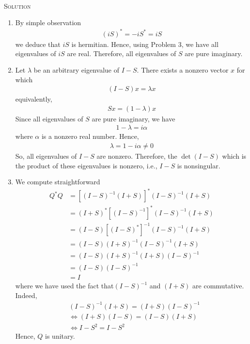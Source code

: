 \documentclass[a4paper,oneside]{book}
\numberwithin{equation}{chapter}
\begin{document}
\textsc{Solution} 
\begin{enumerate}
\item By simple observation
\begin{align}
{\left( {iS} \right)^*} =  - i{S^*} = iS
\end{align}
we deduce that $iS$ is hermitian. Hence, using Problem 3, we have all eigenvalues of $iS$ are real. Therefore, all eigenvalues of $S$ are pure imaginary.
\item Let $\lambda$ be an arbitrary eigenvalue of $I-S$. There exists a nonzero vector $x$ for which
\begin{align}
\left( {I - S} \right)x = \lambda x
\end{align}
equivalently,
\begin{align}
Sx = \left( {1 - \lambda } \right)x
\end{align}
Since all eigenvalues of $S$ are pure imaginary, we have
\begin{align}
1 - \lambda  = i\alpha 
\end{align}
where $\alpha$ is a nonzero real number. Hence,
\begin{align}
\lambda  = 1 - i\alpha  \ne 0
\end{align}
So, all eigenvalues of $I-S$ are nonzero. Therefore, the $\det \left( I-S\right)$ which is the product of these eigenvalues is nonzero, i.e., $I-S$ is nonsingular.
\item We compute straightforward
\begin{align}
{Q^*}Q &= {\left[ {{{\left( {I - S} \right)}^{ - 1}}\left( {I + S} \right)} \right]^*}{\left( {I - S} \right)^{ - 1}}\left( {I + S} \right)\\
 &= {\left( {I + S} \right)^*}{\left[ {{{\left( {I - S} \right)}^{ - 1}}} \right]^*}{\left( {I - S} \right)^{ - 1}}\left( {I + S} \right)\\
 &= \left( {I - S} \right){\left[ {{{\left( {I - S} \right)}^*}} \right]^{ - 1}}{\left( {I - S} \right)^{ - 1}}\left( {I + S} \right)\\
 &= \left( {I - S} \right){\left( {I + S} \right)^{ - 1}}{\left( {I - S} \right)^{ - 1}}\left( {I + S} \right)\\
 &= \left( {I - S} \right){\left( {I + S} \right)^{ - 1}}\left( {I + S} \right){\left( {I - S} \right)^{ - 1}}\\
 &= \left( {I - S} \right){\left( {I - S} \right)^{ - 1}}\\
 &= I
\end{align}
where we have used the fact that${\left( {I - S} \right)^{ - 1}}$ and $\left( {I + S} \right)$ are commutative. Indeed,
\begin{align}
& {\left( {I - S} \right)^{ - 1}}\left( {I + S} \right) = \left( {I + S} \right){\left( {I - S} \right)^{ - 1}}\\
& \Leftrightarrow \left( {I + S} \right)\left( {I - S} \right) = \left( {I - S} \right)\left( {I + S} \right)\\
& \Leftrightarrow I - {S^2} = I - {S^2}
\end{align}
Hence, $Q$ is unitary.
\end{enumerate}
\end{document}
